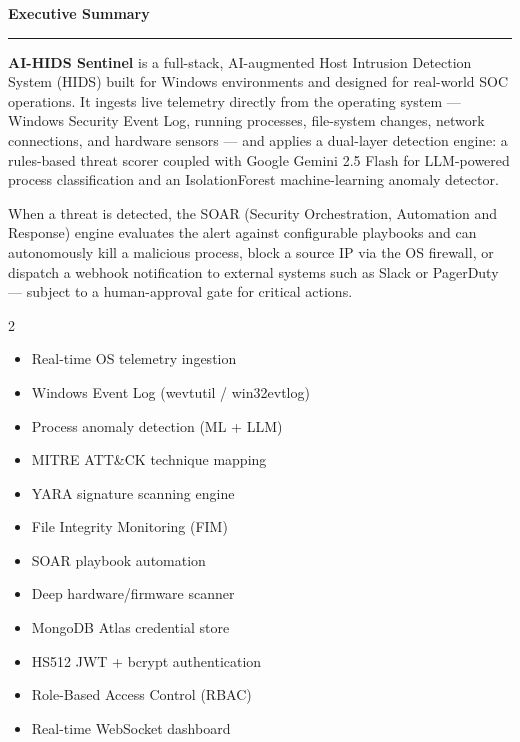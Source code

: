 \documentclass[12pt,a4paper]{article}
\begin{document}
\newpage
\thispagestyle{empty}

\begin{center}
    {\LARGE\bfseries\color{primary} Executive Summary}\\[0.3cm]
    {\color{primary}\rule{0.6\linewidth}{1.5pt}}
\end{center}
\vspace{0.5cm}

\begin{onehalfspace}
\textbf{AI-HIDS Sentinel} is a full-stack, AI-augmented Host Intrusion Detection System (HIDS)
built for Windows environments and designed for real-world SOC operations.
It ingests live telemetry directly from the operating system — Windows Security Event Log,
running processes, file-system changes, network connections, and hardware sensors — and
applies a dual-layer detection engine: a rules-based threat scorer coupled with
Google Gemini 2.5 Flash for LLM-powered process classification and an IsolationForest
machine-learning anomaly detector.

When a threat is detected, the SOAR (Security Orchestration, Automation and Response)
engine evaluates the alert against configurable playbooks and can autonomously kill a
malicious process, block a source IP via the OS firewall, or dispatch a webhook
notification to external systems such as Slack or PagerDuty — subject to a human-approval
gate for critical actions.

\medskip

\begin{tcolorbox}[enhanced, colback=primary!6, colframe=primary, arc=6pt,
    title=\textbf{Key Capabilities at a Glance}, fonttitle=\color{white}]
\begin{multicols}{2}
\begin{itemize}[leftmargin=*, noitemsep]
    \item Real-time OS telemetry ingestion
    \item Windows Event Log (wevtutil / win32evtlog)
    \item Process anomaly detection (ML + LLM)
    \item MITRE ATT\&CK technique mapping
    \item YARA signature scanning engine
    \item File Integrity Monitoring (FIM)
    \item SOAR playbook automation
    \item Deep hardware/firmware scanner
    \item MongoDB Atlas credential store
    \item HS512 JWT + bcrypt authentication
    \item Role-Based Access Control (RBAC)
    \item Real-time WebSocket dashboard
\end{itemize}
\end{multicols}
\end{tcolorbox}


\end{onehalfspace}
\end{document}
